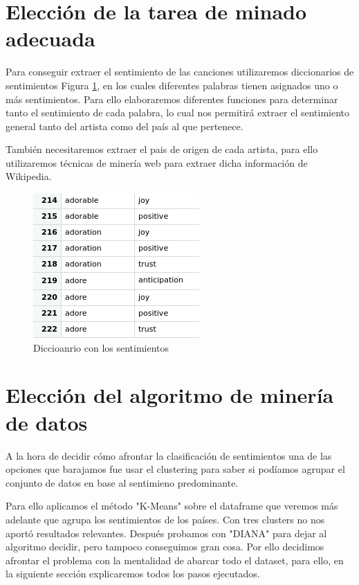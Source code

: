\section{Elección de la tarea de minado adecuada}

Para conseguir extraer el sentimiento de las canciones utilizaremos diccionarios de sentimientos Figura \ref{fig:diccionariosentimientos}, en los cuales diferentes palabras tienen asignados uno o más sentimientos. Para ello elaboraremos diferentes funciones para determinar tanto el sentimiento de cada palabra, lo cual nos permitirá extraer el sentimiento general tanto del artista como del país al que pertenece.

También necesitaremos extraer el pais de origen de cada artista, para ello utilizaremos técnicas de minería web para extraer dicha información de Wikipedia.

\begin{figure}[h!]
	\centering
	\includegraphics[width=0.6\linewidth]{Imagenes/diccionariosentimientos}
	\caption{Diccioanrio con los sentimientos}
	\label{fig:diccionariosentimientos}
\end{figure}

\section{Elección del algoritmo de minería de datos}

A la hora de decidir cómo afrontar la clasificación de sentimientos una de las opciones que barajamos fue usar el clustering para saber si podíamos agrupar el conjunto de datos en base al sentimieno predominante. 

Para ello aplicamos el método "K-Means" sobre el dataframe que veremos más adelante que agrupa los sentimientos de los países. Con tres clusters no nos aportó resultados relevantes. Después probamos con "DIANA" para dejar al algoritmo decidir, pero tampoco conseguimos gran cosa. Por ello decidimos afrontar el problema con la mentalidad de abarcar todo el dataset, para ello, en la siguiente sección explicaremos todos los pasos ejecutados.

